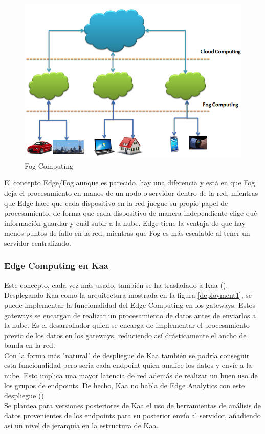 \documentclass[12pt, twoside]{book}
\newcommand{\MYhref}[3][blue]{\href{#2}{\color{#1}{#3}}}
\begin{document}
\begin{figure}[H]
\centering
\includegraphics[scale=0.5]{images/fog_computing}
\caption{Fog Computing}\label{L509}
\end{figure}
El concepto Edge/Fog aunque es parecido, hay una diferencia y está en que Fog deja el procesamiento en manos de un nodo o servidor dentro de la red, mientras que Edge hace que cada dispositivo en la red juegue su propio papel de procesamiento, de forma que cada dispositivo de manera independiente elige qué información guardar y cuál subir a la nube. Edge tiene la ventaja de que hay menos puntos de fallo en la red, mientras que Fog es más escalable al tener un servidor centralizado.

\subsubsection*{Edge Computing en Kaa}
Este concepto, cada vez más usado, también se ha trasladado a Kaa (\MYhref{https://www.kaaproject.org/edge-analytics-kaa/}{vídeo}).\\
Desplegando Kaa como la arquitectura mostrada en la figura \ref{deployment1}, se puede implementar la funcionalidad del Edge Computing en los gateways. Estos gateways se encargan de realizar un procesamiento de datos antes de enviarlos a la nube. Es el desarrollador quien se encarga de implementar el procesamiento previo de los datos en los gateways, reduciendo así drásticamente el ancho de banda en la red. \\

Con la forma más "natural" de despliegue de Kaa también se podría conseguir esta funcionalidad pero sería cada endpoint quien analice los datos y envíe a la nube. Esto implica una mayor latencia de red además de realizar un buen uso de los grupos de endpoints. De hecho, Kaa no habla de Edge Analytics con este despliegue (\MYhref{https://www.kaaproject.org/platform/\#gate}{enlace})\\
Se plantea para versiones posteriores de Kaa el uso de herramientas de análisis de datos provenientes de los endpoints para su posterior envío al servidor, añadiendo así un nivel de jerarquía en la estructura de Kaa.
\end{document}
